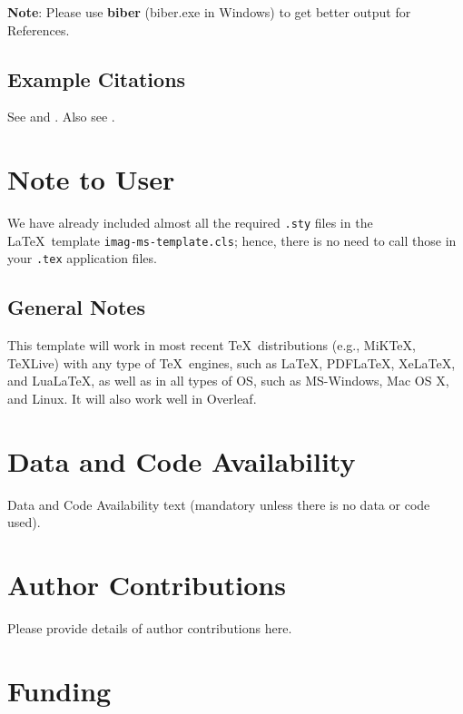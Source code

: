 \documentclass[]{imag-ms-template}
\theoremstyle{plain}
\theoremstyle{remark}
\begin{document}
\bigskip

\textbf{Note}: Please use \textbf{biber} (biber.exe in Windows) to get
better output for References.

\nocite{*}

\subsection{Example Citations}\label{example-citations}

See \textcite{Einstein1905} and \autocite{Goossens1993,Knuth1986}. Also
see \textcite{Chen2023}.

\section{Note to User}\label{note-to-user}

We have already included almost all the required \texttt{.sty} files in
the \LaTeX~template \verb!imag-ms-template.cls!; hence, there is no need
to call those in your \texttt{.tex} application files.

\subsection*{General Notes}\label{general-notes}

\noindent This template will work in most recent \TeX~distributions
(e.g., MiKTeX, TeXLive) with any type of \TeX~engines, such as \LaTeX,
PDF\LaTeX, Xe\LaTeX, and Lua\LaTeX, as well as in all types of OS, such
as MS-Windows, Mac OS X, and Linux. It will also work well in Overleaf.

\section*{Data and Code Availability}

Data and Code Availability text (mandatory unless there is no data or
code used).

\section*{Author Contributions}

Please provide details of author contributions here.

\section*{Funding}
\end{document}
